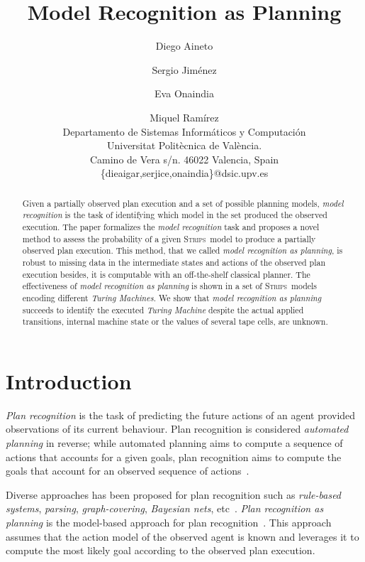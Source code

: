 \documentclass[letterpaper]{article} %
\newcommand{\strips}{\textsc{Strips}}     %
\begin{document}
\title{Model Recognition as Planning}

\author{Diego Aineto\and Sergio Jim\'enez\and Eva Onaindia \and Miquel Ram\'irez\\
{\small Departamento de Sistemas Inform\'aticos y Computaci\'on}\\
{\small Universitat Polit\`ecnica de Val\`encia.}\\
{\small Camino de Vera s/n. 46022 Valencia, Spain}\\
{\small \{dieaigar,serjice,onaindia\}@dsic.upv.es}}



\maketitle
\begin{abstract} 
Given a partially observed plan execution and a set of possible planning models, {\em model recognition} is the task of identifying which model in the set produced the observed execution. The paper formalizes the {\em model recognition} task and proposes a novel method to assess the probability of a given \strips\ model to produce a partially observed plan execution. This method, that we called {\em model recognition as planning}, is robust to missing data in the intermediate states and actions of the observed plan execution besides, it is computable with an off-the-shelf classical planner. The effectiveness of {\em model recognition as planning} is shown in a set of \strips\ models encoding different {\em Turing Machines}. We show that {\em model recognition as planning} succeeds to identify the executed {\em Turing Machine} despite the actual applied transitions, internal machine state or the values of several tape cells, are unknown.
\end{abstract}


\section{Introduction}
\label{sec:introduction}
{\em Plan recognition} is the task of predicting the future actions of an agent provided observations of its current behaviour. Plan recognition is considered {\em automated planning} in reverse; while automated planning aims to compute a sequence of actions that accounts for a given goals, plan recognition aims to compute the goals that account for an observed sequence of actions~\cite{geffner:book:2013}.

Diverse approaches has been proposed for plan recognition such as {\em rule-based systems}, {\em parsing}, {\em graph-covering}, {\em Bayesian nets}, etc~\cite{carberry2001techniques}. {\em Plan recognition as planning} is the model-based approach for plan recognition~\cite{ramirez2012plan,ramirez2009plan}. This approach assumes that the action model of the observed agent is known and leverages it to compute the most likely goal according to the observed plan execution.
\end{document}
